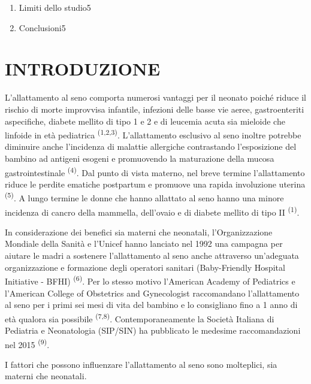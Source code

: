 \documentclass[]{article}
\begin{document}
\begin{enumerate}
  \begin{enumerate}
  \def\labelenumii{\arabic{enumii}.}
  \setcounter{enumii}{20}
  \item
    Limiti dello studio5
  \item
    Conclusioni5
  \end{enumerate}
\end{enumerate}

\hypertarget{introduzione}{%
\section{INTRODUZIONE}\label{introduzione}}

L'allattamento al seno comporta numerosi vantaggi per il neonato poiché
riduce il rischio di morte improvvisa infantile, infezioni delle basse
vie aeree, gastroenteriti aspecifiche, diabete mellito di tipo 1 e 2 e
di leucemia acuta sia mieloide che linfoide in età pediatrica
\textsuperscript{(1,2,3)}. L'allattamento esclusivo al seno inoltre
potrebbe diminuire anche l'incidenza di malattie allergiche contrastando
l'esposizione del bambino ad antigeni esogeni e promuovendo la
maturazione della mucosa gastrointestinale \textsuperscript{(4)}. Dal
punto di vista materno, nel breve termine l'allattamento riduce le
perdite ematiche postpartum e promuove una rapida involuzione uterina
\textsuperscript{(5)}. A lungo termine le donne che hanno allattato al
seno hanno una minore incidenza di cancro della mammella, dell'ovaio e
di diabete mellito di tipo II \textsuperscript{(1)}.

In considerazione dei benefici sia materni che neonatali,
l'Organizzazione Mondiale della Sanità e l'Unicef hanno lanciato nel
1992 una campagna per aiutare le madri a sostenere l'allattamento al
seno anche attraverso un'adeguata organizzazione e formazione degli
operatori sanitari (Baby-Friendly Hospital Initiative - BFHI)
\textsuperscript{(6)}. Per lo stesso motivo l'American Academy of
Pediatrics e l'American College of Obstetrics and Gynecologist
raccomandano l'allattamento al seno per i primi sei mesi di vita del
bambino e lo consigliano fino a 1 anno di età qualora sia possibile
\textsuperscript{(7,8)}. Contemporaneamente la Società Italiana di
Pediatria e Neonatologia (SIP/SIN) ha pubblicato le medesime
raccomandazioni nel 2015 \textsuperscript{(9)}.

I fattori che possono influenzare l'allattamento al seno sono
molteplici, sia materni che neonatali.
\end{document}
